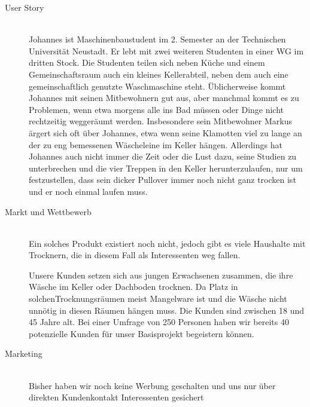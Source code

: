 \begin{description}
\item [User Story] \hfill \\
Johannes ist Maschinenbaustudent im 2. Semester an der Technischen Universität Neustadt. Er lebt mit zwei weiteren Studenten in einer WG im dritten Stock. Die Studenten teilen sich neben Küche und einem Gemeinschaftsraum auch ein kleines Kellerabteil, neben dem auch eine gemeinschaftlich genutzte Waschmaschine steht. Üblicherweise kommt Johannes mit seinen Mitbewohnern gut aus, aber manchmal kommt es zu Problemen, wenn etwa morgens alle ins Bad müssen oder Dinge nicht rechtzeitig weggeräumt werden. Insbesondere sein Mitbewohner Markus ärgert sich oft über Johannes, etwa wenn seine Klamotten viel zu lange an der zu eng bemessenen Wäscheleine im Keller hängen. Allerdings hat Johannes auch nicht immer die Zeit oder die Lust dazu, seine Studien zu unterbrechen und die vier Treppen in den Keller herunterzulaufen, nur um festzustellen, dass sein dicker Pullover immer noch nicht ganz trocken ist und er noch einmal laufen muss.

\item [Markt und Wettbewerb] \hfill \\
		Ein solches Produkt existiert noch nicht, jedoch gibt es viele Haushalte mit Trocknern, die in diesem Fall als Interessenten weg fallen.

			Unsere Kunden setzen sich aus jungen Erwachsenen zusammen, die ihre Wäsche im Keller oder Dachboden trocknen. Da Platz in solchenTrocknungsräumen meist Mangelware ist und die Wäsche nicht unnötig in diesen Räumen hängen muss. Die Kunden sind zwischen 18 und 45 Jahre alt. Bei einer Umfrage von 250 Personen haben wir bereits 40 potenzielle Kunden für unser Basisprojekt begeistern können.
	\item [Marketing] \hfill \\
		Bisher haben wir noch keine Werbung geschalten und uns nur über direkten Kundenkontakt Interessenten gesichert


\end{description}
